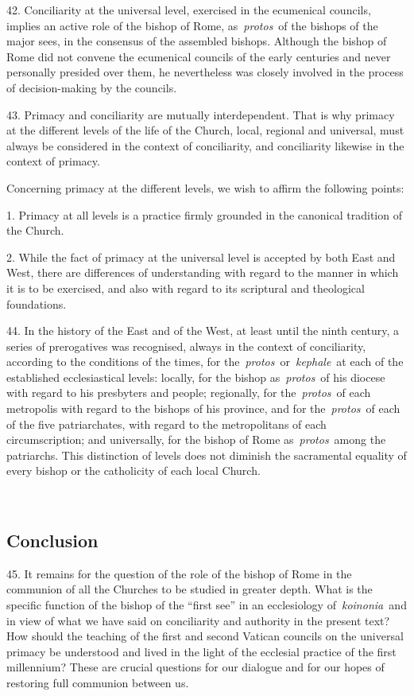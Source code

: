 42. Conciliarity at the universal level, exercised in the ecumenical
councils, implies an active role of the bishop of Rome,
as~\emph{protos}~of the bishops of the major sees, in the consensus of
the assembled bishops. Although the bishop of Rome did not convene the
ecumenical councils of the early centuries and never personally presided
over them, he nevertheless was closely involved in the process of
decision-making by the councils.

43. Primacy and conciliarity are mutually interdependent. That is why
primacy at the different levels of the life of the Church, local,
regional and universal, must always be considered in the context of
conciliarity, and conciliarity likewise in the context of primacy.

Concerning primacy at the different levels, we wish to affirm the
following points:

1. Primacy at all levels is a practice firmly grounded in the canonical
tradition of the Church.

2. While the fact of primacy at the universal level is accepted by both
East and West, there are differences of understanding with regard to the
manner in which it is to be exercised, and also with regard to its
scriptural and theological foundations.

44. In the history of the East and of the West, at least until the ninth
century, a series of prerogatives was recognised, always in the context
of conciliarity, according to the conditions of the times, for
the~\emph{protos}~or~\emph{kephale}~at each of the established
ecclesiastical levels: locally, for the bishop as~\emph{protos}~of his
diocese with regard to his presbyters and people; regionally, for
the~\emph{protos}~of each metropolis with regard to the bishops of his
province, and for the~\emph{protos}~of each of the five patriarchates,
with regard to the metropolitans of each circumscription; and
universally, for the bishop of Rome as~\emph{protos}~among the
patriarchs. This distinction of levels does not diminish the sacramental
equality of every bishop or the catholicity of each local Church.

~

\subsection{Conclusion}\label{conclusion}

45. It remains for the question of the role of the bishop of Rome in the
communion of all the Churches to be studied in greater depth. What is
the specific function of the bishop of the ``first see'' in an
ecclesiology of~\emph{koinonia~}and in view of what we have said on
conciliarity and authority in the present text? How should the teaching
of the first and second Vatican councils on the universal primacy be
understood and lived in the light of the ecclesial practice of the first
millennium? These are crucial questions for our dialogue and for our
hopes of restoring full communion between us.

